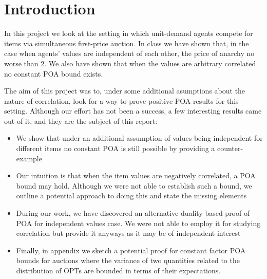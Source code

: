 \section{Introduction}

In this project we look at the setting in which unit-demand agents compete for items  via simultaneous first-price auction. In class we have shown that, in the case when agents' values are independent of each other, the price of anarchy no worse than 2. We also have shown that when the values are arbitrary correlated no constant POA bound exists.

The aim of this project was to, under some additional asumptions about the nature of correlation, look for a way to prove positive POA results for this setting. Although our effort has not been a success, a few interesting results came out of it, and they are the subject of this report:

\begin{itemize}
\item We show that under an additional assumption of values being independent for different items no constant POA is still possible by providing a counter-example
\item Our intuition is that when the item values are negatively correlated, a POA bound may hold. Although we were not able to establish such a bound, we outline a potential approach to doing this and state the missing elements
\item During our work, we have discovered an alternative duality-based proof of POA for independent values case. We were not able to employ it for studying correlation but provide it anyways as it may be of independent interest
\item Finally, in appendix we sketch a potential proof for constant factor POA bounds for auctions where the variance of two quantities related to the distribution of OPTs are bounded in terms of their expectations.
\end{itemize}




